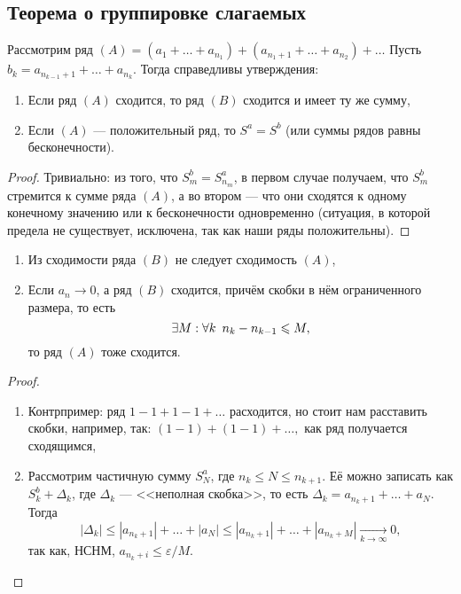 \subsection{Теорема о группировке слагаемых}

\begin{theorem}
	Рассмотрим ряд \((A) = (a_1 + \ldots + a_{n_1}) + (a_{n_1+1} + \ldots + a_{n_2}) + \ldots\) Пусть \(b_k = a_{n_{k-1}+1} + \ldots + a_{n_k}\).  Тогда справедливы утверждения:
	\begin{enumerate}
		\item Если ряд \((A)\) сходится, то ряд \((B)\) сходится и имеет ту же сумму,
		\item Если \((A)\) --- положительный ряд, то \(S^a = S^b\) (или суммы рядов равны бесконечности).
	\end{enumerate}
\end{theorem}
\begin{proof}
	Тривиально: из того, что \(S_m^b = S_{n_m}^a\), в первом случае получаем, что \(S_m^b\) стремится к сумме ряда \((A)\), а во втором --- что они сходятся к одному конечному значению или к бесконечности одновременно (ситуация, в которой предела не существует, исключена, так как наши ряды положительны).
\end{proof}

\begin{remarks}
	\begin{enumerate}
		\item Из сходимости ряда \((B)\) не следует сходимость \((A)\),
		\item Если \(a_n \to 0\), а ряд \((B)\) сходится, причём скобки в нём ограниченного размера, то есть \[
			\exists M : \forall k \enskip n_k - n_{k-1} \leqslant M,
		\]
		то ряд \((A)\) тоже сходится.
	\end{enumerate}
\end{remarks}
\begin{proof}
	\begin{enumerate}
		\item Контрпример: ряд \(1 - 1 + 1 - 1 + \ldots\) расходится, но стоит нам расставить скобки, например, так: \((1 - 1) + (1 - 1) + \ldots, \) как ряд получается сходящимся,
		\item Рассмотрим частичную сумму \(S_N^a\), где \(n_k \leqslant N \leqslant n_{k+1}\). Её можно записать как \(S_k^b + \Delta_k\), где \(\Delta_k\) --- <<неполная скобка>>, то есть \(\Delta_k = a_{n_k + 1} + \ldots + a_N\). Тогда \[
			|\Delta_k| \leqslant |a_{n_k + 1}| + \ldots + |a_N| \leqslant |a_{n_k + 1}| + \ldots + |a_{n_k + M}| \xrightarrow[k \to \infty]{} 0,
		\]
		так как, НСНМ, \(a_{n_k + i} \leqslant \varepsilon / M\).
	\end{enumerate}
\end{proof}

